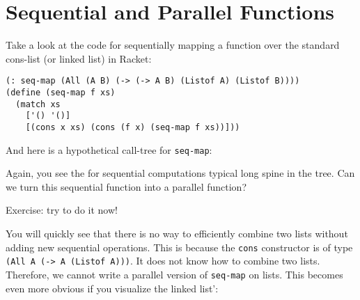 \documentclass{article}
\begin{document}
\section{Sequential and Parallel Functions}

Take a look at the code for sequentially mapping a function over the standard cons-list (or linked list) in Racket:

\begin{lstlisting}
(: seq-map (All (A B) (-> (-> A B) (Listof A) (Listof B))))
(define (seq-map f xs)
  (match xs
    ['() '()]
    [(cons x xs) (cons (f x) (seq-map f xs))]))
\end{lstlisting}

And here is a hypothetical call-tree for \lstinline{seq-map}:

\begin{center}
\end{center}

Again, you see the for sequential computations typical long spine in the tree. Can we turn this sequential function into a parallel function?

Exercise: try to do it now!

You will quickly see that there is no way to efficiently combine two lists without adding new sequential operations. This is because the \lstinline{cons} constructor is of type \lstinline{(All A (-> A (Listof A)))}. It does not know how to combine two lists. Therefore, we cannot write a parallel version of \lstinline{seq-map} on lists. This becomes even more obvious if you visualize the linked list':

\begin{center}
\end{center}
\end{document}
